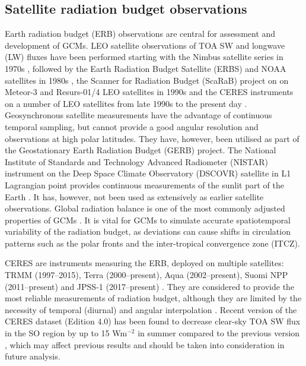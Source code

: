 \subsection{Satellite radiation budget observations}

Earth radiation budget (ERB) observations are central for assessment and development
of GCMs. LEO satellite observations of TOA SW and longwave (LW) fluxes
have been performed starting with the Nimbus satellite series in 1970s
\citep{smith1977}, followed by the Earth Radiation Budget Satellite (ERBS) and NOAA
satellites in 1980s \citep{barkstrom1984}, the Scanner for Radiation Budget (ScaRaB)
project on on Meteor-3 and Resurs-01/4 LEO satellites in 1990s \citep{kandel1994}
and the
CERES instruments on a number of LEO satellites from late 1990s
to the present day \citep{wielicki1996}. Geosynchronous satellite measurements
have the advantage of continuous temporal sampling, but cannot provide a
good angular resolution and observations at high polar latitudes. They have,
however, been utilised as part of the Geostationary Earth Radiation Budget (GERB)
project.
The National Institute of Standards and Technology Advanced Radiometer (NISTAR)
instrument on the Deep Space Climate Observatory (DSCOVR) satellite in L1 Lagrangian point provides continuous
measurements of the sunlit part of the Earth \citep{khlopenkov2017}. It has,
however, not been used
as extensively as earlier satellite observations. Global radiation balance
is one of the most commonly adjusted properties of GCMs
\citep{hourdin2017,schmidt2017}. It is vital for GCMs to simulate accurate
spatiotemporal variability of the radiation budget, as deviations can cause
shifts in circulation patterns such as the polar fronts and
the inter-tropical convergence zone (ITCZ).

CERES are instruments measuring the ERB,
deployed on multiple satellites:
TRMM (1997--2015), Terra (2000--present), Aqua (2002--present), Suomi NPP (2011--present) and JPSS-1
(2017--present) \citep{damadeo2017}. They are
considered to provide the most reliable measurements of radiation budget,
although they are limited by the necessity of temporal (diurnal) and angular
interpolation \citep{smith2011}.
Recent version of the CERES dataset (Edition 4.0) has been found to decrease
clear-sky TOA SW flux in the SO region by up to 15 Wm$^{-2}$
in summer compared to the previous version \citep{loeb2017},
which may affect previous results and should be taken into consideration in
future analysis.

